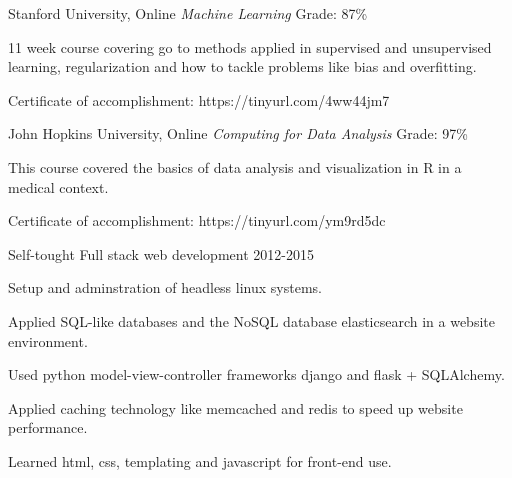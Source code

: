 

\begin{cventries}

\cventry
  {Stanford University, Online} %
  {\textit{Machine Learning}}
  {Grade: 87\%} %
  {} %
  {
    \begin{cvitems} %
      \item {11 week course covering go to methods applied in supervised and unsupervised learning, regularization and how to tackle problems like bias and overfitting.}
      \item {Certificate of accomplishment: https://tinyurl.com/4ww44jm7}
    \end{cvitems}
  }

\cventry
  {John Hopkins University, Online} %
  {\textit{Computing for Data Analysis}} %
  {Grade: 97\%} %
  {} %
  {
    \begin{cvitems} %
      \item {This course covered the basics of data analysis and visualization in R in a medical context.}
      \item {Certificate of accomplishment: https://tinyurl.com/ym9rd5dc}
    \end{cvitems}
  }

\cventry
  {Self-tought} %
  {Full stack web development} %
  {2012-2015} %
  {} %
  {
    \begin{cvitems} %
      \item {Setup and adminstration of headless linux systems.}
      \item {Applied SQL-like databases and the NoSQL database elasticsearch in a website environment.}
      \item {Used python model-view-controller frameworks django and flask + SQLAlchemy.}
      \item {Applied caching technology like memcached and redis to speed up website performance.}
      \item {Learned html, css, templating and javascript for front-end use.}
    \end{cvitems}
  }
\end{cventries}
